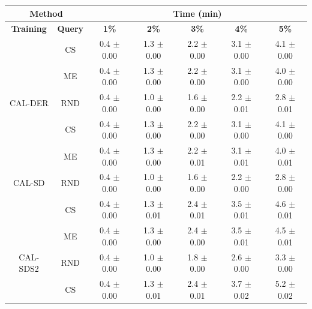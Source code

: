 \begin{table}[htbp]
\centering

\begin{tabular*}{\linewidth}{c|c|@{\extracolsep{\fill}}ccccc}
\toprule
\multicolumn{2}{c|}{\textbf{Method}} & \multicolumn{5}{c}{\textbf{Time (min)}} \\
\midrule
\textbf{Training} & \textbf{Query} & \textbf{1\%} & \textbf{2\%} & \textbf{3\%} & \textbf{4\%} & \textbf{5\%}\\
\midrule
 & CS & 0.4 $\pm$ {\small 0.00} & 1.3 $\pm$ {\small 0.00} & 2.2 $\pm$ {\small 0.00} & 3.1 $\pm$ {\small 0.00} & 4.1 $\pm$ {\small 0.00}\\

 & ME & 0.4 $\pm$ {\small 0.00} & 1.3 $\pm$ {\small 0.00} & 2.2 $\pm$ {\small 0.00} & 3.1 $\pm$ {\small 0.00} & 4.0 $\pm$ {\small 0.00}\\

\multirow{-3}{*}{\raggedright\arraybackslash CAL-DER} & RND & 0.4 $\pm$ {\small 0.00} & 1.0 $\pm$ {\small 0.00} & 1.6 $\pm$ {\small 0.00} & 2.2 $\pm$ {\small 0.01} & 2.8 $\pm$ {\small 0.01}\\
\midrule
 & CS & 0.4 $\pm$ {\small 0.00} & 1.3 $\pm$ {\small 0.00} & 2.2 $\pm$ {\small 0.00} & 3.1 $\pm$ {\small 0.00} & 4.1 $\pm$ {\small 0.00}\\

 & ME & 0.4 $\pm$ {\small 0.00} & 1.3 $\pm$ {\small 0.00} & 2.2 $\pm$ {\small 0.01} & 3.1 $\pm$ {\small 0.01} & 4.0 $\pm$ {\small 0.01}\\

\multirow{-3}{*}{\raggedright\arraybackslash CAL-SD} & RND & 0.4 $\pm$ {\small 0.00} & 1.0 $\pm$ {\small 0.00} & 1.6 $\pm$ {\small 0.00} & 2.2 $\pm$ {\small 0.00} & 2.8 $\pm$ {\small 0.00}\\
\midrule
 & CS & 0.4 $\pm$ {\small 0.00} & 1.3 $\pm$ {\small 0.01} & 2.4 $\pm$ {\small 0.01} & 3.5 $\pm$ {\small 0.01} & 4.6 $\pm$ {\small 0.01}\\

 & ME & 0.4 $\pm$ {\small 0.00} & 1.3 $\pm$ {\small 0.00} & 2.4 $\pm$ {\small 0.00} & 3.5 $\pm$ {\small 0.01} & 4.5 $\pm$ {\small 0.01}\\

\multirow{-3}{*}{\raggedright\arraybackslash CAL-SDS2} & RND & 0.4 $\pm$ {\small 0.00} & 1.0 $\pm$ {\small 0.00} & 1.8 $\pm$ {\small 0.00} & 2.6 $\pm$ {\small 0.00} & 3.3 $\pm$ {\small 0.00}\\
\midrule
 & CS & 0.4 $\pm$ {\small 0.00} & 1.3 $\pm$ {\small 0.01} & 2.4 $\pm$ {\small 0.01} & 3.7 $\pm$ {\small 0.02} & 5.2 $\pm$ {\small 0.02}\\


\end{tabular*}
\end{table}
